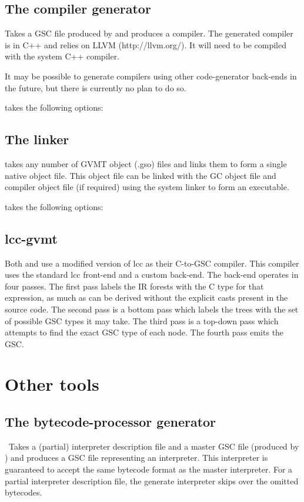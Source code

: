 

\subsection{The compiler generator \gvmtcc{}\label{sect:gvmtcc}}
\gvmtcc{} Takes a GSC file produced by \gvmtic{} and produces a compiler. The generated compiler is in C++ and relies on LLVM (http://llvm.org/).
It will need to be compiled with the system C++ compiler.

It may be possible to generate compilers using other code-generator back-ends in the future, but there is currently no plan to do so.

\gvmtcc{} takes the following options:



\subsection{The linker \glink{}\label{sect:glink}}
\glink{} takes any number of GVMT object (.gso) files and links them to form a single native object file.
This object file can be linked with the GC object file and compiler object file (if required)
using the system linker to form an executable.

\glink{} takes the following options:



\subsection{lcc-gvmt\label{sect:lcc}}
Both \gvmtic{} and \gvmtc{} use a modified version of lcc as their C-to-GSC compiler. This compiler uses the standard lcc front-end and a custom back-end. The back-end operates in four passes. The first pass labels the IR forests with the C type for that expression, as much as can be derived without the explicit casts present in the source code. The second pass is a bottom pass which labels the trees with the set 
of possible GSC types it may take. The third pass is a top-down pass which attempts to find the exact GSC type of each node. The fourth pass emits the GSC.

\section{Other tools}

\subsection{The bytecode-processor generator \gvmtxc\label{sect:gvmtxc}}
\gvmtxc\ Takes a (partial) interpreter description file and a master GSC file (produced by \gvmtic) and produces a GSC file representing an interpreter. This interpreter is guaranteed to accept the same bytecode format as the master interpreter.
For a partial interpreter description file, the generate interpreter skips over the omitted bytecodes.

